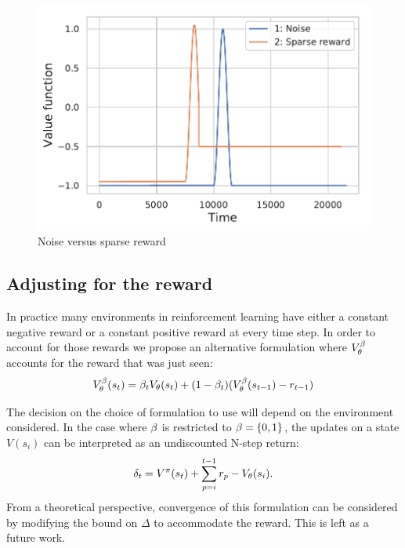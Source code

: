 \begin{figure}[h]
    \centering
    \includegraphics[scale=0.5]{fig/noise_sparse.pdf}
    \caption{Noise versus sparse reward}
    \label{fig:noise}
\end{figure}

\subsection{Adjusting for the reward}
In practice many environments in reinforcement learning have either a constant negative reward or a constant positive reward at every time step. In order to account for those rewards we propose an alternative formulation where $V^{\beta}_{\theta}$ accounts for the reward that was just seen:
\begin{equation}
\label{value_reward}
    V^{\beta}_{\theta}(s_t) = \beta_t V_{\theta}(s_t) + (1 - \beta_t) (V^{\beta}_{\theta}(s_{t-1}) - r_{t-1}) 
\end{equation}

The decision on the choice of formulation to use will depend on the environment considered. In the case where $\beta$ is restricted to $\beta = \{0,1\}$, the updates on a state $V(s_i)$ can be interpreted as an undiscounted N-step return:
\begin{equation}\label{undiscounted}
        \delta_t = V^{\pi}(s_t) + \sum_{p=i}^{t-1} r_p - V_{\theta}(s_i).
\end{equation}
From a theoretical perspective, convergence of this formulation can be considered by modifying the bound on $\Delta$ to accommodate the reward. This is left as a future work. 

